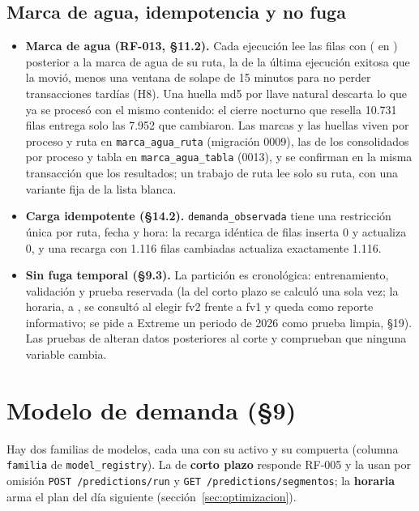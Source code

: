 \documentclass[10pt,a4paper]{article}
\begin{document}
\subsection{Marca de agua, idempotencia y no fuga}
\begin{itemize}
\item \textbf{Marca de agua (RF-013, §11.2).} Cada ejecución lee las filas con 
  ( en ) posterior a la marca de agua de su ruta, la de la última
  ejecución exitosa que la movió, menos una ventana de solape de 15 minutos para no perder transacciones tardías (H8).
  Una huella md5 por llave natural descarta lo que ya se procesó con el mismo contenido: el cierre nocturno que resella
  10.731 filas entrega solo las 7.952 que cambiaron. Las marcas y las huellas viven por proceso y ruta en
  \texttt{marca\_agua\_ruta} (migración 0009), las de los consolidados por proceso y tabla en
  \texttt{marca\_agua\_tabla} (0013), y se confirman en la misma transacción que los resultados; un trabajo de ruta lee
  solo su ruta, con una variante fija de la lista blanca.
\item \textbf{Carga idempotente (§14.2).} \texttt{demanda\_observada} tiene una restricción única por ruta, fecha y
  hora: la recarga idéntica de \IngestaFilas{} filas inserta 0 y actualiza 0, y una recarga con 1.116 filas cambiadas
  actualiza exactamente 1.116. 
\item \textbf{Sin fuga temporal (§9.3).} La partición es cronológica: entrenamiento, validación y prueba reservada
  (la del corto plazo se calculó una sola vez; la horaria, \PruebaDesde{} a \PruebaHasta, se consultó al elegir fv2
  frente a fv1 y queda como reporte informativo; se pide a Extreme un periodo de 2026 como prueba limpia, §19). Las
  pruebas de  alteran datos posteriores al corte y comprueban que ninguna variable cambia.
\end{itemize}

\section{Modelo de demanda (§9)}
\label{sec:modelo}
Hay dos familias de modelos, cada una con su activo y su compuerta (columna \texttt{familia} de
\texttt{model\_registry}). La de \textbf{corto plazo} responde RF-005 y la usan por omisión \texttt{POST
/predictions/run} y \texttt{GET /predictions/segmentos}; la \textbf{horaria} arma el plan del día siguiente
(sección~\ref{sec:optimizacion}).
\end{document}
